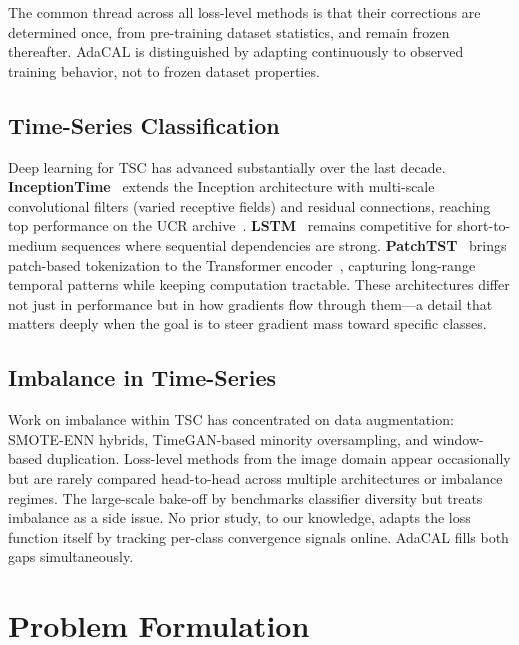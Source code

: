 \documentclass[letterpaper]{article}
\begin{document}
The common thread across all loss-level methods is that their corrections are determined once, from pre-training dataset statistics, and remain frozen thereafter. AdaCAL is distinguished by adapting continuously to observed training behavior, not to frozen dataset properties.

\subsection{Time-Series Classification}

Deep learning for TSC has advanced substantially over the last decade. \textbf{InceptionTime}~\citep{fawaz2020inceptiontime} extends the Inception architecture with multi-scale convolutional filters (varied receptive fields) and residual connections, reaching top performance on the UCR archive~\citep{dau2018ucr}. \textbf{LSTM}~\citep{hochreiter1997lstm} remains competitive for short-to-medium sequences where sequential dependencies are strong. \textbf{PatchTST}~\citep{nie2023patchtst} brings patch-based tokenization to the Transformer encoder~\citep{vaswani2017attention}, capturing long-range temporal patterns while keeping computation tractable. These architectures differ not just in performance but in how gradients flow through them---a detail that matters deeply when the goal is to steer gradient mass toward specific classes.

\subsection{Imbalance in Time-Series}

Work on imbalance within TSC has concentrated on data augmentation: SMOTE-ENN hybrids, TimeGAN-based minority oversampling, and window-based duplication. Loss-level methods from the image domain appear occasionally but are rarely compared head-to-head across multiple architectures or imbalance regimes. The large-scale bake-off by \citet{bagnall2017bakeoff} benchmarks classifier diversity but treats imbalance as a side issue. No prior study, to our knowledge, adapts the loss function itself by tracking per-class convergence signals online. AdaCAL fills both gaps simultaneously.

\section{Problem Formulation}
\end{document}
